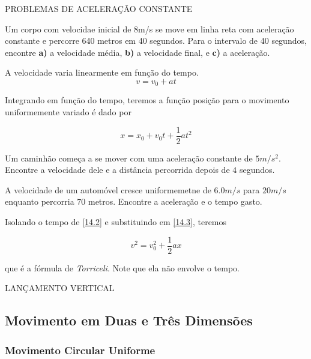 PROBLEMAS DE ACELERAÇÃO CONSTANTE

\begin{exe}
Um corpo com velocidae inicial de 8m/s se move em linha reta com aceleração constante e percorre 640 metros em 40 segundos. Para o intervalo de 40 segundos, encontre \textbf{a)} a velocidade média, \textbf{b)} a velocidade final, e \textbf{c)} a aceleração.
\end{exe}

A velocidade varia linearmente em função do tempo.
\begin{equation}\label{14.2}
v=v_0+at    
\end{equation}

Integrando em função do tempo, teremos a função posição para o movimento uniformemente variado é dado por

\begin{equation}\label{14.3}
x=x_0+v_0t+\frac{1}{2}at^2   
\end{equation}

\begin{exe}
Um caminhão começa a se mover com uma aceleração constante de $5m/s^2$. Encontre a velocidade dele e a distância percorrida depois de $4$ segundos.
\end{exe}

\begin{exe}
A velocidade de um automóvel cresce uniformemetne de $6.0m/s$ para $20m/s$ enquanto percorria $70$ metros. Encontre a aceleração e o tempo gasto.
\end{exe}

Isolando o tempo de \eqref{14.2} e substituindo em \eqref{14.3}, teremos

\begin{equation}\label{14.4}
    v^2=v_0^2+\frac{1}{2}ax
\end{equation}

que é a fórmula de \textit{Torriceli}. Note que ela não envolve o tempo.

LANÇAMENTO VERTICAL

\subsection{Movimento em Duas e Três Dimensões}

\subsubsection{Movimento Circular Uniforme}

